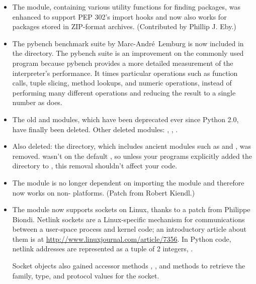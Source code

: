 \documentclass{howto}
\begin{document}
\begin{itemize}
\item The  module, containing various utility
functions for finding packages, was enhanced to support PEP 302's
import hooks and now also works for packages stored in ZIP-format archives.
(Contributed by Phillip J. Eby.)

\item The pybench benchmark suite by Marc-Andr\'e~Lemburg is now
included in the  directory.  The pybench suite is
an improvement on the commonly used  program because
pybench provides a more detailed measurement of the interpreter's
performance.  It times particular operations such as function calls,
tuple slicing, method lookups, and numeric operations, instead of
performing many different operations and reducing the result to a
single number as  does.

\item The old  and  modules, which have been 
deprecated ever since Python 2.0, have finally been deleted.  
Other deleted modules: , ,
.

\item Also deleted: the  directory,
which includes ancient modules such as  and
, was removed.   wasn't on the default
, so unless your programs explicitly added the directory to 
, this removal shouldn't affect your code.

\item The  module is no longer 
dependent on importing the  module and
therefore now works on non-{\UNIX} platforms.
(Patch from Robert Kiendl.)

\item The  module now supports 
sockets on Linux, thanks to a patch from Philippe Biondi.  
Netlink sockets are a Linux-specific mechanism for communications
between a user-space process and kernel code; an introductory 
article about them is at \url{http://www.linuxjournal.com/article/7356}.
In Python code, netlink addresses are represented as a tuple of 2 integers, 
.

Socket objects also gained accessor methods , 
, and  methods to retrieve the
family, type, and protocol values for the socket.


\end{itemize}
\end{document}
